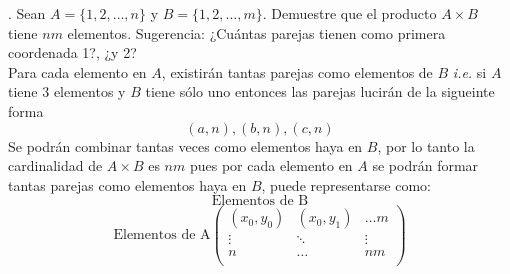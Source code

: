\documentclass[letterpaper]{article}
\renewcommand{\*}{\cdot}
\theoremstyle{definition}
\begin{document}
. Sean $ A = \{ 1,2, \dots, n \} $ y $ B = \{ 1,2, \dots, m \} $. Demuestre que el producto $ A \times B $ tiene $ nm $ elementos. Sugerencia: ¿Cuántas parejas tienen como primera coordenada 1?, ¿y 2?\\

Para cada elemento en $ A $, existirán tantas parejas como elementos de $ B $ \textit{i.e.} si $ A $ tiene $ 3 $ elementos y $ B $ tiene sólo uno entonces las parejas lucirán de la sigueinte forma 
\[ (a,n), (b,n), (c,n) \]
Se podrán combinar tantas veces como elementos haya en $ B $, por lo tanto la cardinalidad de $ A \times B $ es $ nm $ pues por cada elemento en $ A $ se podrán formar tantas parejas como elementos haya en $ B $, puede representarse como:
\[ \text{Elementos de B} \]
\[\text{Elementos de A} \begin{pmatrix}
(x_0,y_0) & (x_0,y_1 ) & \dots m\\
\vdots & \ddots& \vdots\\
n & \dots& nm\\
\end{pmatrix}
\]
\end{document}
